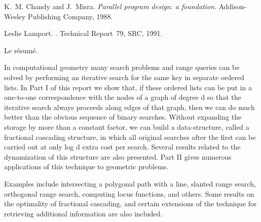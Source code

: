 \documentclass[11pt]{thesul}
\begin{document}
%
%

\begin{thebibliography}{Lam91a}

K.~M. Chandy and J.~Misra.
\newblock \emph{Parallel program design: a foundation}.
\newblock Addison-Wesley Publishing Company, 1988.

Leslie Lamport.
.
\newblock Technical Report~79, SRC, 1991.

\end{thebibliography}


\NumberAbstractPages
\begin{ThesisAbstract}
  \begin{FrenchAbstract}
    Le résumé.
  \end{FrenchAbstract}
  \begin{EnglishAbstract}
    In computational geometry many search problems and range queries
    can be solved by performing an iterative search for the same key
    in separate ordered lists.  In Part I of this report we show that,
    if these ordered lists can be put in a one-to-one correspondence
    with the nodes of a graph of degree  d  so that the iterative
    search always proceeds along edges of that graph, then we can
    do much better than the obvious sequence of binary searches. Without
    expanding the storage by more than a constant factor, we can build
    a data-structure, called a fractional cascading structure,
    in which all original searches after the first can be carried
    out at only  log d  extra cost per search.  Several results related
    to the dynamization of this structure are also presented. Part
    II gives  numerous applications of this technique to geometric
    problems.  

    Examples include intersecting a polygonal path with
    a line, slanted range search, orthogonal range search, computing
    locus functions, and others. Some results on the optimality of
    fractional cascading, and certain extensions of the technique
    for retrieving additional information are also included.
  \end{EnglishAbstract}
\end{ThesisAbstract}
\end{document}
